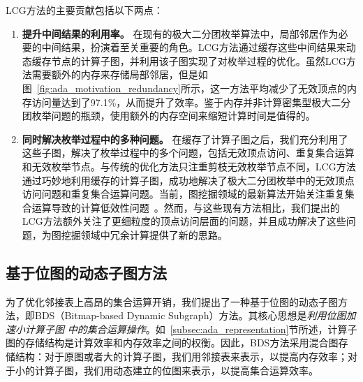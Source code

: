 \begin{example}
\end{example}

LCG方法的主要贡献包括以下两点：

\begin{enumerate}
	\item \textbf{提升中间结果的利用率。}
	在现有的极大二分团枚举算法中，局部邻居作为必要的中间结果，扮演着至关重要的角色。LCG方法通过缓存这些中间结果来动态缓存节点的计算子图，并利用该子图实现了对枚举过程的优化。虽然LCG方法需要额外的内存来存储局部邻居，但是如图~\ref{fig:ada_motivation_redundancy}所示，这一方法平均减少了无效顶点的内存访问量达到了97.1\%，从而提升了效率。鉴于内存并非计算密集型极大二分团枚举问题的瓶颈，使用额外的内存空间来缩短计算时间是值得的。
	


	\item \textbf{同时解决枚举过程中的多种问题。}
	在缓存了计算子图之后，我们充分利用了这些子图，解决了枚举过程中的多个问题，包括无效顶点访问、重复集合运算和无效枚举节点。与传统的优化方法只注重剪枝无效枚举节点不同，LCG方法通过巧妙地利用缓存的计算子图，成功地解决了极大二分团枚举中的无效顶点访问问题和重复集合运算问题。当前，图挖掘领域的最新算法开始关注重复集合运算导致的计算低效性问题~\cite{Graphpi20,GPMredundancy23}。然而，与这些现有方法相比，我们提出的LCG方法额外关注了更细粒度的顶点访问层面的问题，并且成功解决了这些问题，为图挖掘领域中冗余计算提供了新的思路。

\end{enumerate}



\subsection{基于位图的动态子图方法}
\label{subsec:ada_design_1}

为了优化邻接表上高昂的集合运算开销，我们提出了一种基于位图的动态子图方法，即BDS（Bitmap-based Dynamic Subgraph）方法。其核心思想是\emph{利用位图加速小计算子图} \emph{中的集合运算操作}。如~\ref{subsec:ada_representation}节所述，计算子图的存储结构是计算效率和内存效率之间的权衡。因此，BDS方法采用混合图存储结构：对于原图或者大的计算子图，我们用邻接表来表示，以提高内存效率；对于小的计算子图，我们用动态建立的位图来表示，以提高集合运算效率。

